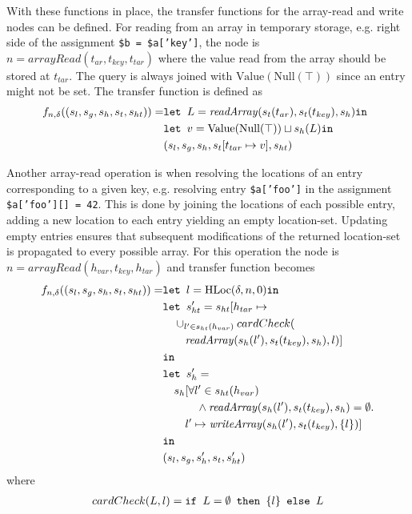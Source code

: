 With these functions in place, the transfer functions for the array-read and write nodes can be defined. For reading from an array in temporary storage, e.g. right side of the assignment \texttt{\$b = \$a['key']}, the node is $n = \mathit{arrayRead}(t_{ar},t_{key},t_{tar})$ where the value read from the array should be stored at $t_{tar}$. The query is always joined with $\text{Value}(\text{Null}(\top))$ since an entry might not be set. The transfer function is defined as
\begin{align}
f_{n,\delta}((s_l, s_g, s_h, s_t, s_{ht})) =   &\texttt{let } L = \mathit{readArray}(s_t(t_{ar}), s_t(t_{key}) ,s_h) \texttt{in }\notag\\
                                    &\texttt{let } v = \text{Value}(\text{Null}(\top))\sqcup s_h(L) \texttt{in }\notag\\
                                    &  (s_l, s_g, s_h, s_t[t_{tar}\mapsto v], s_{ht})
\end{align}

Another array-read operation is when resolving the locations of an entry corresponding to a given key, e.g. resolving entry \texttt{\$a['foo']} in the assignment \texttt{\$a['foo'][] = 42}. This is done by joining the locations of each possible entry, adding a new location to each entry yielding an empty location-set. Updating empty entries ensures that subsequent modifications of the returned location-set is propagated to every possible array. For this operation the node is $n = \mathit{arrayRead}(h_{var},t_{key},h_{tar})$ and transfer function becomes
\begin{align}
f_{n,\delta}((s_l, s_g, s_h, s_t, s_{ht})) =   &\texttt{let } l = \text{HLoc}(\delta, n, 0) \texttt{in }\notag\\
                                    &\texttt{let } s_{ht}' = s_{ht}[h_{tar} \mapsto \notag\\
                                    & \quad \cup_{l'\in s_{ht}(h_{var})}cardCheck(\notag\\
                                    &\quad\quad \mathit{readArray}(s_h(l'), s_t(t_{key}), s_h), l)]\notag\\
                                    & \texttt{in }\notag\\
                                    &\texttt{let } s_h' = \notag\\
                                    &\quad s_h[\forall l' \in s_{ht}(h_{var}) \notag\\
                                    &\quad\quad\quad\wedge \mathit{readArray}(s_h(l'), s_t(t_{key}), s_h) = \emptyset.\notag\\
                                    &\quad\quad l' \mapsto \mathit{writeArray}(s_h(l'), s_t(t_{key}), \{l\})]\notag\\
                                    & \texttt{in }\notag\\
                                    &(s_l, s_g, s_h', s_t, s_{ht}')
\end{align}
where 
\begin{align}
cardCheck(L, l) = \texttt{if }L = \emptyset\texttt{ then } \{l\} \texttt{ else } L
\end{align}

